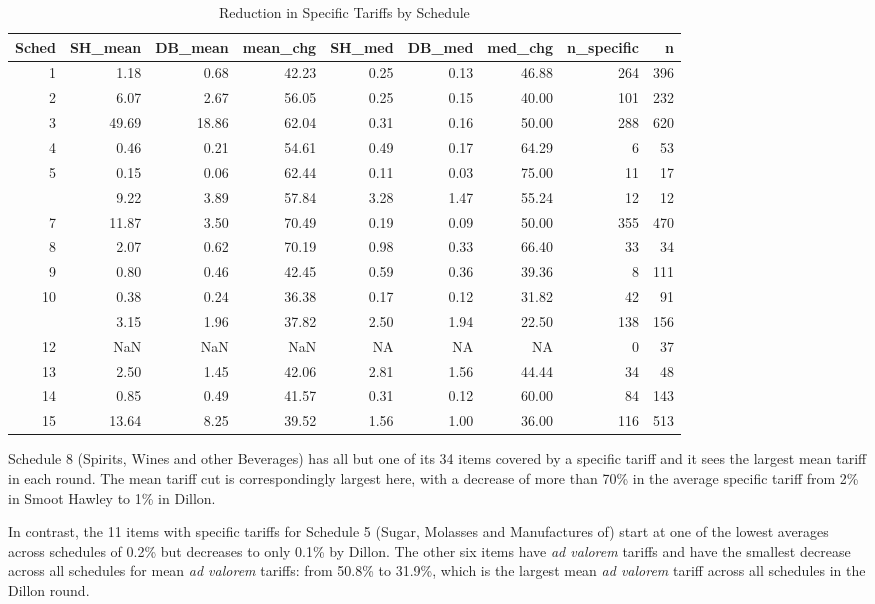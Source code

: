\documentclass[
  12pt,
]{article}
\begin{document}
\begin{table}[!h]

\caption{\label{tab:sp-sc}Reduction in Specific Tariffs by Schedule}
\centering
\begin{tabular}[t]{rrrrrrrrr}
\toprule
Sched & SH\_mean & DB\_mean & mean\_chg & SH\_med & DB\_med & med\_chg & n\_specific & n\\
\midrule
1 & 1.18 & 0.68 & 42.23 & 0.25 & 0.13 & 46.88 & 264 & 396\\
2 & 6.07 & 2.67 & 56.05 & 0.25 & 0.15 & 40.00 & 101 & 232\\
3 & 49.69 & 18.86 & 62.04 & 0.31 & 0.16 & 50.00 & 288 & 620\\
4 & 0.46 & 0.21 & 54.61 & 0.49 & 0.17 & 64.29 & 6 & 53\\
5 & 0.15 & 0.06 & 62.44 & 0.11 & 0.03 & 75.00 & 11 & 17\\
\addlinespace
6 & 9.22 & 3.89 & 57.84 & 3.28 & 1.47 & 55.24 & 12 & 12\\
7 & 11.87 & 3.50 & 70.49 & 0.19 & 0.09 & 50.00 & 355 & 470\\
8 & 2.07 & 0.62 & 70.19 & 0.98 & 0.33 & 66.40 & 33 & 34\\
9 & 0.80 & 0.46 & 42.45 & 0.59 & 0.36 & 39.36 & 8 & 111\\
10 & 0.38 & 0.24 & 36.38 & 0.17 & 0.12 & 31.82 & 42 & 91\\
\addlinespace
11 & 3.15 & 1.96 & 37.82 & 2.50 & 1.94 & 22.50 & 138 & 156\\
12 & NaN & NaN & NaN & NA & NA & NA & 0 & 37\\
13 & 2.50 & 1.45 & 42.06 & 2.81 & 1.56 & 44.44 & 34 & 48\\
14 & 0.85 & 0.49 & 41.57 & 0.31 & 0.12 & 60.00 & 84 & 143\\
15 & 13.64 & 8.25 & 39.52 & 1.56 & 1.00 & 36.00 & 116 & 513\\
\bottomrule
\end{tabular}
\end{table}

Schedule 8 (Spirits, Wines and other Beverages) has all but one of its 34 items covered by a specific tariff and it sees the largest mean tariff in each round. The mean tariff cut is correspondingly largest here, with a decrease of more than 70\% in the average specific tariff from 2\% in Smoot Hawley to 1\% in Dillon.

In contrast, the 11 items with specific tariffs for Schedule 5 (Sugar, Molasses and Manufactures of) start at one of the lowest averages across schedules of 0.2\% but decreases to only 0.1\% by Dillon. The other six items have \emph{ad valorem} tariffs and have the smallest decrease across all schedules for mean \emph{ad valorem} tariffs: from 50.8\% to 31.9\%, which is the largest mean \emph{ad valorem} tariff across all schedules in the Dillon round.
\end{document}
